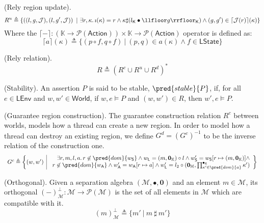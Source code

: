  (Rely region update).
\[
	R^u \triangleq \{ \left( (l, g, \mathcal{J}), (l, g', \mathcal{J}) \right)\ |\ \exists r, \kappa \ldotp \imath(\kappa) = r \land  \kappa \sharp (l_\mathsf{K} \bullet \llfloor g \rrfloor_\mathsf{K}) \land (g, g') \in \lceil \mathcal{J}(r) \rceil (\kappa) \}
\]
Where the $\lceil - \rceil : \left( \mathbb{K} \rightarrow \mathcal{P}(\mathsf{Action}) \right) \times \mathbb{K} \rightarrow \mathcal{P}(\mathsf{Action})$ operator is defined as:
\[
	\lceil a \rceil (\kappa) \triangleq \{ (p \circ f, q \circ f)\ |\ (p, q) \in a(\kappa) \land f \in \mathsf{LState} \}
\]

\param (Rely relation).
\[
	R \triangleq (R^c \cup R^u \cup R^d)^*
\]
%	

 (Stability). An assertion $P$ is said to be stable, $\pred{stable}{P}$, if, for all $e \in \mathsf{LEnv}$ and $w, w' \in \mathsf{World}$, if $w, e \vDash P$ and $(w, w') \in R$, then $w', e \vDash P$.

 (Guarantee region construction). The guarantee construction relation $R^c$ between worlds, models how a thread can create a new region. In order to model how a thread can destroy an existing region, we define $G^d = (G^c)^{-1}$ to be the inverse relation of the construction one.
\[
\begin{array}{r | l}
	G^c \triangleq \bigg\{ (w, w')
	&
	\begin{array}{r}
		\exists r, m, l, a \ldotp r \not\in \pred{dom}{w_\mathsf{S}} \land w_\mathsf{L} = (m, \mathbf{0}_\mathbb{K}) \circ l \land w'_\mathsf{S} = w_\mathsf{S}[r \mapsto (m, \mathbf{0}_\mathbb{K}) ] \land
		\\
		r \not\in \pred{dom}{w_\mathsf{A}} \land w'_\mathsf{A} = w_\mathsf{A}[r \mapsto a] \land w'_\mathsf{L} = l_2 \circ (\mathbf{0}_\mathbb{M}, \prod^{\bullet_\mathbb{K}}_{\kappa' \in \pred{dom}{a}} \kappa')
	\end{array}
	\bigg\}
\end{array}
\]

 (Orthogonal). Given a separation algebra $(\mathcal{M}, \bullet, \mathbf{0})$ and an element $m \in \mathcal{M}$, its orthogonal $(-)^\bot_\mathcal{M} : \mathcal{M} \rightarrow \mathcal{P}(\mathcal{M})$ is the set of all elements in $\mathcal{M}$ which are compatible with it.
\[
	(m)^\bot_\mathcal{M} \triangleq \{m'\ |\ m\ \sharp\ m' \}
\]

